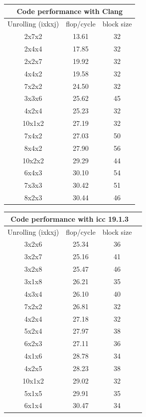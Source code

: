 \documentclass[sigconf,review]{acmart}
\begin{document}
\begin{figure}[ht]
{    \scriptsize
    \begin{tabular}{|c|c|c|}
      \hline
      \multicolumn{3}{|c|}{Code performance with Clang} \\
      \hline
      Unrolling (ixkxj) & flop/cycle & block size \\
      \hline
      2x7x2 & 13.61  & 32\\
2x4x4 & 17.85  & 32\\
2x2x7 & 19.92  & 32\\
4x4x2 & 19.58  & 32\\
7x2x2 & 24.50  & 32\\
3x3x6 & 25.62  & 45\\
4x2x4 & 25.23  & 32\\
10x1x2 & 27.19  & 32\\
7x4x2 & 27.03  & 50\\
8x4x2 & 27.90  & 56\\
10x2x2 & 29.29  & 44\\
6x4x3 & 30.10  & 54\\
7x3x3 & 30.42  & 51\\
8x2x3 & 30.44  & 46\\
\hline
\end{tabular}
    \begin{tabular}{|c|c|c|c|}
      \hline
      \multicolumn{3}{|c|}{Code performance with icc 19.1.3} \\
      \hline
      Unrolling (ixkxj) & flop/cycle  & block size \\
      \hline
3x2x6 & 25.34  & 36\\
3x2x7 & 25.16  & 41\\
3x2x8 & 25.47  & 46\\
3x1x8 & 26.21  & 35\\
4x3x4 & 26.10  & 40\\
7x2x2 & 26.81 & 32 \\
4x2x4 & 27.18  & 32\\
5x2x4 & 27.97  & 38\\
6x2x3 & 27.11  & 36\\
4x1x6 & 28.78  & 34\\
4x2x5 & 28.23  & 38\\
10x1x2 & 29.02  & 32\\
5x1x5 & 29.91  & 35\\
6x1x4 & 30.47  & 34\\
\hline
    \end{tabular}
    \begin{tabular}{|c|c|c|c|}

\end{tabular}}
\end{figure}
\end{document}
